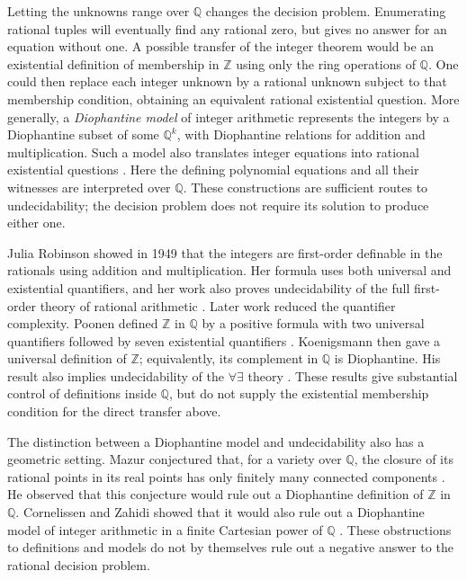 Letting the unknowns range over \(\mathbb Q\) changes the decision
problem.  Enumerating rational tuples will eventually find any rational
zero, but gives no answer for an equation without one.  A possible
transfer of the integer theorem would be an existential definition of
membership in \(\mathbb Z\) using only the ring operations of
\(\mathbb Q\).  One could then replace each integer unknown by a
rational unknown subject to that membership condition, obtaining an
equivalent rational existential question.  More generally, a
\emph{Diophantine model} of integer arithmetic represents the integers
by a Diophantine subset of some \(\mathbb Q^k\), with Diophantine
relations for addition and multiplication.  Such a model also
translates integer equations into rational existential questions
\cite[Definition~3.1 and Observation~3.3]{CornelissenZahidi2000}.
Here the defining polynomial equations and all their witnesses are
interpreted over \(\mathbb Q\).
These constructions are sufficient routes to undecidability; the
decision problem does not require its solution to produce either one.

Julia Robinson showed in 1949 that the integers are first-order
definable in the rationals using addition and multiplication.  Her
formula uses both universal and existential quantifiers, and her work
also proves undecidability of the full first-order theory of rational
arithmetic \cite[Theorems~3.1 and~4.2]{Robinson1949}.  Later work
reduced the quantifier complexity.  Poonen defined \(\mathbb Z\) in
\(\mathbb Q\) by a positive formula with two universal quantifiers
followed by seven existential quantifiers
\cite[Theorem~4.1]{Poonen2009}.  Koenigsmann then gave a universal
definition of \(\mathbb Z\); equivalently, its complement in
\(\mathbb Q\) is Diophantine.  His result also implies undecidability
of the \(\forall\exists\) theory
\cite[Theorem~1 and Corollaries~2--3]{Koenigsmann2016}.  These results
give substantial control of definitions inside \(\mathbb Q\), but
do not supply the existential membership condition for the direct
transfer above.

The distinction between a Diophantine model and undecidability also
has a geometric setting.  Mazur conjectured that, for a variety over
\(\mathbb Q\), the closure of its rational points in its real points
has only finitely many connected components
\cite[Conjecture~3]{Mazur1995}.  He observed that this conjecture
would rule out a Diophantine definition of \(\mathbb Z\) in
\(\mathbb Q\).  Cornelissen and Zahidi showed that it would also rule
out a Diophantine model of integer arithmetic in a finite Cartesian
power of \(\mathbb Q\)
\cite[Theorem~3.6]{CornelissenZahidi2000}.  These obstructions to
definitions and models do not by themselves rule out a negative
answer to the rational decision problem.

